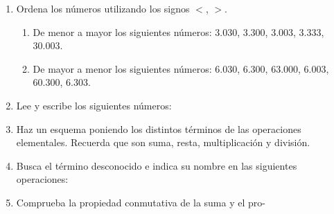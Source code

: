 \documentclass[twoside]{article}
\begin{document}
\begin{enumerate}
\item Ordena los números utilizando los signos $<$, $>$.
\begin{enumerate}
\item De menor a mayor los siguientes números: 3.030,
3.300, 3.003, 3.333, 30.003.
\item De mayor a menor los siguientes números: 6.030,
6.300, 63.000, 6.003, 60.300, 6.303.
\end{enumerate}
\item Lee y escribe los siguientes números:
\begin{enumerate}
\end{enumerate}
\item Haz un esquema poniendo los distintos términos de las operaciones elementales. Recuerda que son suma, resta, multiplicación y división.
\item Busca el término desconocido e indica su nombre en las siguientes operaciones:
\begin{enumerate}
\end{enumerate}
\item Comprueba la propiedad conmutativa de la suma y el pro-

\end{enumerate}
\end{document}
